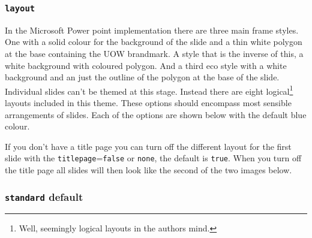 \documentclass[a4paper,oneside,11pt]{article}
\newcommand{\key}[1]{\texttt{\color{UOWorange}#1}}
\newcommand{\val}[1]{\texttt{\color{UOWblue}#1}}
\begin{document}
\subsubsection*{\key{layout}}%
In the Microsoft Power point implementation there are three main frame styles. One with a solid colour for the background of the slide and a thin white polygon at the base containing the UOW brandmark. A style that is the inverse of this, a white background with coloured polygon. And a third eco style with a white background and an just the outline of the polygon at the base of the slide. Individual slides can't be themed at this stage. Instead there are eight logical\footnote{Well, seemingly logical layouts in the authors mind.} layouts included in this theme. These options should encompass most sensible arrangements of slides. Each of the options are shown below with the default blue colour.

If you don't have a title page you can turn off the different layout for the first slide with the \key{titlepage}=\val{false} or \val{none}, the default is \val{true}. When you turn off the title page all slides will then look like the second of the two images below.

\subsubsection*{\val{standard} default}%
\par
\end{document}
